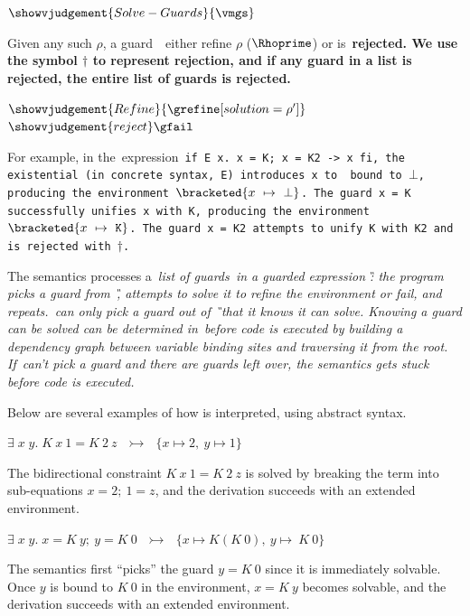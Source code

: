 \documentclass[runningheads]{llncs}
\begin{document}
    \(\showvjudgement{Solve-Guards}{\vmgs}\)

Given any such $\rho$, a guard~\g\ either refine $\rho$
($\Rhoprime$) or is~\bf{rejected}. %
We use the symbol $\dagger$ to
represent rejection, and if any guard in a list is rejected, the entire list of
guards is rejected. %

\(\showvjudgement{Refine}{\grefine[solution=\rho']}\)
\hspace{2in}
\(\showvjudgement{reject}\gfail\)

  For example, in the~\VMinus expression~\tt{if E x. x = K; x = K2 -> x fi}, the
  existential (in concrete syntax,~\tt{E}) introduces~\tt{x} to~\Rho\ bound to
  $\bot$, producing the environment $\bracketed{x~\mapsto~\bot}$. %
The guard
  \tt{x = K} successfully unifies~\tt{x} with~\tt{K}, producing the environment
  $\bracketed{x~\mapsto~\tt{K}}$. %
The guard~\tt{x = K2} attempts to unify~\tt{K}
  with~\tt{K2} and is rejected with $\dagger$. %


The semantics processes a~\it{list} of guards~\gs in a guarded
expression \G: the program picks a guard from~\G, attempts to solve it to refine
the environment or fail, and repeats.~\VMinus can only pick a guard out of \G\
that it \it{knows} it can solve. %
\it{Knowing} a guard can be solved can be determined in~\VMinus before code is
executed by building a dependency graph between variable binding sites and
traversing it from the root. %
If~\VMinus can't pick a guard and there are
guards left over, the semantics gets stuck before code is executed. %

Below are several examples of how \VMinus is interpreted, using abstract syntax. 

\begin{example}
  $\exists\; x\;y.\; K~x~1 = K~2~z~~~\rightarrowtail~~~\{x \mapsto 2,~y\mapsto1\}$  
\end{example}


The bidirectional constraint $K~x~1 = K~2~z$ is solved by breaking the term into
sub-equations $x = 2;~1=z$, and the derivation succeeds with an extended
environment. 

\begin{example}
  $\exists\; x\;y.\; x=K~y;~y = K~0~~~\rightarrowtail~~~\{x \mapsto K (K~0),~y\mapsto~K~0\}$  
\end{example}

The semantics first ``picks'' the guard $y = K~0$ since it is immediately
solvable. %
Once $y$ is bound to $K~0$ in the environment, $x=K~y$ becomes solvable, and
the derivation succeeds with an extended environment. 
\end{document}
